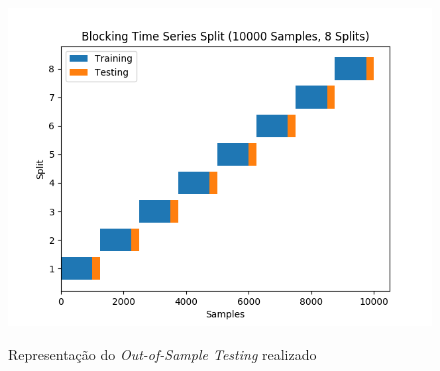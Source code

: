 \begin{figure}[H]
    \centering
    \includegraphics[scale=0.7]{monography/img/methods/blocking_cv.png}
    \label{figure:blocking}
    \caption[Representação do \textit{Out-of-Sample Testing} realizado]{Representação do \textit{Out-of-Sample Testing} realizado}
\end{figure}